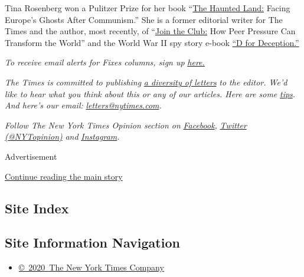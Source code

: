 Tina Rosenberg won a Pulitzer Prize for her book
``\href{http://www.randomhouse.com/catalog/display.pperl?isbn=9780679744993}{The
Haunted Land:} Facing Europe's Ghosts After Communism.'' She is a former
editorial writer for The Times and the author, most recently, of
``\href{http://books.wwnorton.com/books/Join-the-Club}{Join the Club:}
How Peer Pressure Can Transform the World'' and the World War II spy
story e-book
\href{https://www.goodreads.com/book/show/16124470-d-for-deception}{``D
for Deception.''}

\emph{To receive email alerts for Fixes columns, sign up}
\href{http://eepurl.com/ABIxL}{\emph{here.}}

\emph{The Times is committed to publishing}
\href{https://www.nytimes.com/2019/01/31/opinion/letters/letters-to-editor-new-york-times-women.html}{\emph{a
diversity of letters}} \emph{to the editor. We'd like to hear what you
think about this or any of our articles. Here are some}
\href{https://help.nytimes.com/hc/en-us/articles/115014925288-How-to-submit-a-letter-to-the-editor}{\emph{tips}}\emph{.
And here's our email:}
\href{mailto:letters@nytimes.com}{\emph{letters@nytimes.com}}\emph{.}

\emph{Follow The New York Times Opinion section on}
\href{https://www.facebook.com/nytopinion}{\emph{Facebook}}\emph{,}
\href{http://twitter.com/NYTOpinion}{\emph{Twitter (@NYTopinion)}}
\emph{and}
\href{https://www.instagram.com/nytopinion/}{\emph{Instagram}}\emph{.}

Advertisement

\protect\hyperlink{after-bottom}{Continue reading the main story}

\hypertarget{site-index}{%
\subsection{Site Index}\label{site-index}}

\hypertarget{site-information-navigation}{%
\subsection{Site Information
Navigation}\label{site-information-navigation}}

\begin{itemize}
\tightlist
\item
  \href{https://help.nytimes.com/hc/en-us/articles/115014792127-Copyright-notice}{©~2020~The
  New York Times Company}
\end{itemize}

